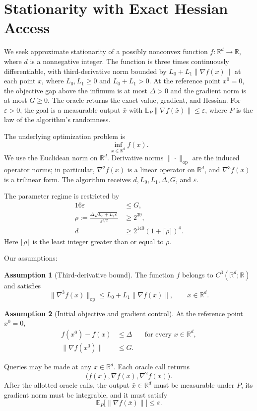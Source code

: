\documentclass[10pt]{article}
\theoremstyle{definition}
\newtheorem{assumption}{Assumption}
\begin{document}
\section*{Stationarity with Exact Hessian Access}
We seek approximate stationarity of a possibly nonconvex function $f:\mathbb{R}^d\to\mathbb{R}$, where $d$ is a nonnegative integer. The function is three times continuously differentiable, with third-derivative norm bounded by $L_0+L_1\|\nabla f(x)\|$ at each point $x$, where $L_0,L_1\geq0$ and $L_0+L_1>0$. At the reference point $x^0=0$, the objective gap above the infimum is at most $\Delta>0$ and the gradient norm is at most $G\geq0$. The oracle returns the exact value, gradient, and Hessian. For $\varepsilon>0$, the goal is a measurable output $\bar{x}$ with $\mathbb{E}_{P}\|\nabla f(\bar{x})\|\leq\varepsilon$, where $P$ is the law of the algorithm's randomness.

The underlying optimization problem is
\[
\inf_{x\in\mathbb{R}^d} f(x).
\]
We use the Euclidean norm on $\mathbb{R}^d$. Derivative norms $\|\cdot\|_{\mathrm{op}}$ are the induced operator norms; in particular, $\nabla^2 f(x)$ is a linear operator on $\mathbb{R}^d$, and $\nabla^3 f(x)$ is a trilinear form. The algorithm receives $d,L_0,L_1,\Delta,G$, and $\varepsilon$.

The parameter regime is restricted by
\[
\begin{aligned}
16\varepsilon&\leq G,\\
\rho:=\frac{\Delta\sqrt{L_0+L_1\varepsilon}}
{\varepsilon^{3/2}}&\geq 2^{39},\\
d&\geq 2^{140}(1+\lceil\rho\rceil)^4.
\end{aligned}
\]
Here $\lceil\rho\rceil$ is the least integer greater than or equal to $\rho$.

Our assumptions:
\begin{assumption}[Third-derivative bound]
The function $f$ belongs to $C^3(\mathbb{R}^d;\mathbb{R})$ and satisfies
\[
\|\nabla^3 f(x)\|_{\mathrm{op}}
\leq L_0+L_1\|\nabla f(x)\|,
\qquad x\in\mathbb{R}^d.
\]
\end{assumption}

\begin{assumption}[Initial objective and gradient control]
At the reference point $x^0=0$,
\[
\begin{aligned}
f(x^0)-f(x)&\leq\Delta
&&\text{for every }x\in\mathbb{R}^d,\\
\|\nabla f(x^0)\|&\leq G.
\end{aligned}
\]
\end{assumption}

Queries may be made at any $x\in\mathbb{R}^d$. Each oracle call returns
\[
\bigl(f(x),\nabla f(x),\nabla^2 f(x)\bigr).
\]
After the allotted oracle calls, the output $\bar{x}\in\mathbb{R}^d$ must be measurable under $P$, its gradient norm must be integrable, and it must satisfy
\[
\mathbb{E}_{P}\bigl[\|\nabla f(\bar{x})\|\bigr]
\leq\varepsilon.
\]
\end{document}
